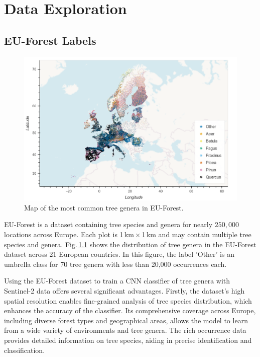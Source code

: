 \chapter{Data Exploration}
\label{chapter:data}
\section{EU-Forest Labels}

\begin{figure}[!thb]
    \centering
    \includegraphics[width=0.98\linewidth]{figures/figures_labels/genus_cutoff_map.png}
    \caption{Map of the most common tree genera in EU-Forest.}
    \label{fig:genus_cutoff_map}
\end{figure}

EU-Forest is a dataset containing tree species and genera for nearly $250,000$ locations across Europe. Each plot is 1\,km\,×\,1\,km and may contain multiple tree species and genera. Fig.\,\ref{fig:genus_cutoff_map} shows the distribution of tree genera in the EU-Forest dataset across 21 European countries. In this figure, the label 'Other' is an umbrella class for 70 tree genera with less than 20,000 occurrences each.

Using the EU-Forest dataset to train a CNN classifier of tree genera with Sentinel-2 data offers several significant advantages. Firstly, the dataset's high spatial resolution enables fine-grained 
analysis of tree species distribution, which enhances the accuracy of the classifier. Its comprehensive coverage across Europe, including diverse forest types and geographical areas, allows the model to learn from a wide variety of environments and tree genera. The rich occurrence data provides detailed information on tree species, aiding in precise identification and classification.


